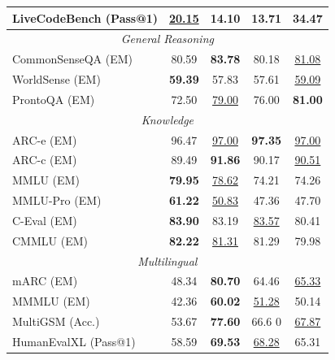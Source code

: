 \begin{table}[h]
{\begin{tabular}{lcccc}
LiveCodeBench (Pass@1) & \underline{20.15} & 14.10 & 13.71 & \textbf{34.47}\\
\midrule
\multicolumn{5}{c}{\textit{General Reasoning}} \\
\midrule
CommonSenseQA (EM) & 80.59 & \textbf{83.78} & 80.18 & \underline{81.08} \\

WorldSense (EM) & \textbf{59.39} & 57.83 & 57.61 & \underline{59.09} \\
ProntoQA (EM) & 72.50 & \underline{79.00} & 76.00 & \textbf{81.00} \\
\midrule
\multicolumn{5}{c}{\textit{Knowledge}} \\
\midrule
ARC-e (EM) & 96.47 & \underline{97.00} & \textbf{97.35} & \underline{97.00} \\
ARC-c (EM) & 89.49 & \textbf{91.86} & 90.17 & \underline{90.51} \\
MMLU (EM) & \textbf{79.95} & \underline{78.62} & 74.21 & 74.26\\
MMLU-Pro (EM) & \textbf{61.22} & \underline{50.83} & 47.36 & 47.70\\
C-Eval (EM) & \textbf{83.90} & 83.19 & \underline{83.57} & 80.41\\
CMMLU (EM) & \textbf{82.22} & \underline{81.31} & 81.29 & 79.98\\
\midrule
\multicolumn{5}{c}{\textit{Multilingual}} \\
\midrule
mARC (EM) & 48.34 & \textbf{80.70} & 64.46 & \underline{65.33} \\
MMMLU (EM) & 42.36  & \textbf{60.02} & \underline{51.28} & 50.14\\
MultiGSM (Acc.) & 53.67 & \textbf{77.60} & 66.6 0& \underline{67.87} \\
HumanEvalXL (Pass@1) & 58.59 & \textbf{69.53} & \underline{68.28}	& 65.31 \\
\bottomrule
\end{tabular}
}
\end{table}

